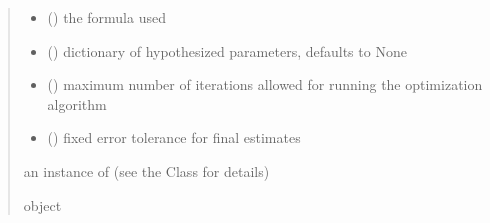 \documentclass[letterpaper,10pt,english]{sphinxmanual}
\begin{document}
\begin{fulllineitems}
\begin{quote}
\begin{description}
\begin{itemize}
\item {} 
\sphinxAtStartPar
{} () \textendash{} the formula used

\item {} 
\sphinxAtStartPar
{} (\sphinxstyleliteralemphasis{\sphinxupquote{, }}) \textendash{} dictionary of hypothesized parameters, defaults to None

\item {} 
\sphinxAtStartPar
{} () \textendash{} maximum number of iterations allowed for running the optimization algorithm

\item {} 
\sphinxAtStartPar
{} () \textendash{} fixed error tolerance for final estimates

\end{itemize}

\sphinxAtStartPar
an instance of  (see the Class for details)

\sphinxAtStartPar
object

\end{description}\end{quote}

\end{fulllineitems}

\end{document}
